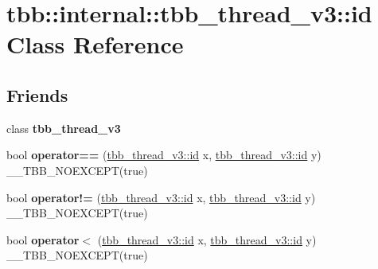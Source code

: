 \hypertarget{classtbb_1_1internal_1_1tbb__thread__v3_1_1id}{}\section{tbb\+:\+:internal\+:\+:tbb\+\_\+thread\+\_\+v3\+:\+:id Class Reference}
\label{classtbb_1_1internal_1_1tbb__thread__v3_1_1id}
\subsection*{Friends}
\begin{DoxyCompactItemize}
\item 
\hypertarget{classtbb_1_1internal_1_1tbb__thread__v3_1_1id_aa08381fcad9d2adc0bf8fb009ad38366}{}class {\bfseries tbb\+\_\+thread\+\_\+v3}\label{classtbb_1_1internal_1_1tbb__thread__v3_1_1id_aa08381fcad9d2adc0bf8fb009ad38366}

\item 
\hypertarget{classtbb_1_1internal_1_1tbb__thread__v3_1_1id_a1ffa9d9b2f7e18d73535b2879ba64ae0}{}bool {\bfseries operator==} (\hyperlink{classtbb_1_1internal_1_1tbb__thread__v3_1_1id}{tbb\+\_\+thread\+\_\+v3\+::id} x, \hyperlink{classtbb_1_1internal_1_1tbb__thread__v3_1_1id}{tbb\+\_\+thread\+\_\+v3\+::id} y) \+\_\+\+\_\+\+T\+B\+B\+\_\+\+N\+O\+E\+X\+C\+E\+P\+T(true)\label{classtbb_1_1internal_1_1tbb__thread__v3_1_1id_a1ffa9d9b2f7e18d73535b2879ba64ae0}

\item 
\hypertarget{classtbb_1_1internal_1_1tbb__thread__v3_1_1id_a3be52bbc6138f2d2180d89d588b5c404}{}bool {\bfseries operator!=} (\hyperlink{classtbb_1_1internal_1_1tbb__thread__v3_1_1id}{tbb\+\_\+thread\+\_\+v3\+::id} x, \hyperlink{classtbb_1_1internal_1_1tbb__thread__v3_1_1id}{tbb\+\_\+thread\+\_\+v3\+::id} y) \+\_\+\+\_\+\+T\+B\+B\+\_\+\+N\+O\+E\+X\+C\+E\+P\+T(true)\label{classtbb_1_1internal_1_1tbb__thread__v3_1_1id_a3be52bbc6138f2d2180d89d588b5c404}

\item 
\hypertarget{classtbb_1_1internal_1_1tbb__thread__v3_1_1id_a5cd4a67d579d3ea07557ce6a632bdff0}{}bool {\bfseries operator$<$} (\hyperlink{classtbb_1_1internal_1_1tbb__thread__v3_1_1id}{tbb\+\_\+thread\+\_\+v3\+::id} x, \hyperlink{classtbb_1_1internal_1_1tbb__thread__v3_1_1id}{tbb\+\_\+thread\+\_\+v3\+::id} y) \+\_\+\+\_\+\+T\+B\+B\+\_\+\+N\+O\+E\+X\+C\+E\+P\+T(true)\label{classtbb_1_1internal_1_1tbb__thread__v3_1_1id_a5cd4a67d579d3ea07557ce6a632bdff0}


\end{DoxyCompactItemize}

